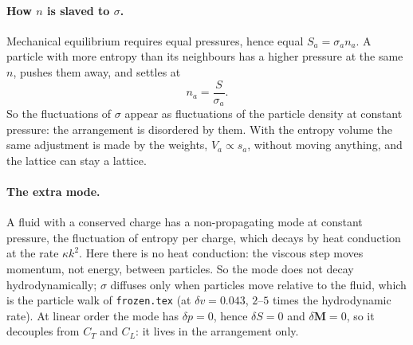 \documentclass[11pt,aps,preprint,nofootinbib,superscriptaddress,tightenlines]{revtex4-2}
\def\st{\begin{equation}}
\def\stp{\end{equation}}
\let\oldparagraph\paragraph
\renewcommand{\paragraph}{\par\bigskip\oldparagraph}
\begin{document}
\paragraph{How $n$ is slaved to $\sigma$.}  Mechanical equilibrium requires equal
pressures, hence equal $S_a=\sigma_an_a$.  A particle with more entropy than its
neighbours has a higher pressure at the same $n$, pushes them away, and settles at
\st
n_a=\frac{S}{\sigma_a}.
\stp
So the fluctuations of $\sigma$ appear as fluctuations of the particle density at
constant pressure: the arrangement is disordered by them.  With the entropy volume the same
adjustment is made by the weights, $V_a\propto s_a$, without moving anything, and the
lattice can stay a lattice.

\paragraph{The extra mode.}  A fluid with a conserved charge has a non-propagating mode
at constant pressure, the fluctuation of entropy per charge, which decays by heat
conduction at the rate $\kappa k^2$.  Here there is no heat conduction: the viscous step
moves momentum, not energy, between particles.  So the mode does not decay
hydrodynamically; $\sigma$ diffuses only when particles move relative to the fluid,
which is the particle walk of \texttt{frozen.tex} (at $\delta v=0.043$, $2$--$5$ times the
hydrodynamic rate).  At linear order the mode has $\delta p=0$, hence $\delta S=0$ and
$\delta\bm M=0$, so it decouples from $C_T$ and $C_L$: it lives in the arrangement only.
\end{document}
